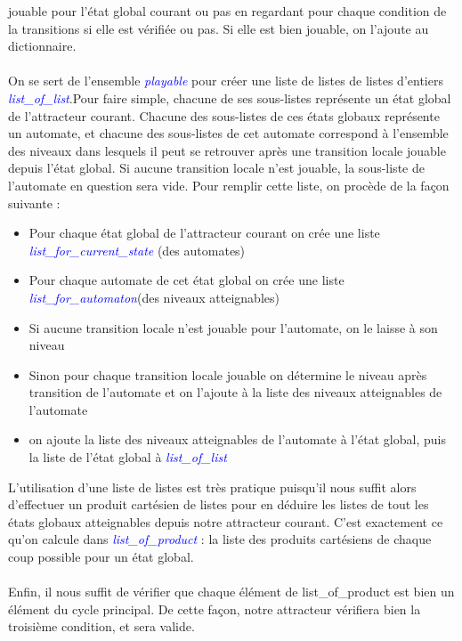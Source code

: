 \documentclass[10pt,a4paper]{article}
\begin{document}
jouable pour l'état global courant ou pas en regardant pour chaque condition de la transitions si elle est vérifiée ou pas. Si elle est bien jouable, on l'ajoute au dictionnaire.\\ \\
On se sert de l'ensemble \emph{\textcolor{blue}{playable}} pour créer une liste de listes de listes d'entiers \emph{\textcolor{blue}{list\_of\_list}}.Pour faire simple, chacune de ses sous-listes représente un état global de 
l'attracteur courant. Chacune des sous-listes de ces états globaux représente un automate, et chacune des sous-listes de cet automate correspond à l'ensemble des niveaux dans lesquels il peut se retrouver après une transition locale 
jouable depuis l'état global. Si aucune transition locale n'est jouable, la sous-liste de l'automate en question sera vide. Pour remplir cette liste, on procède de la façon suivante :\\
\begin{itemize}
	\item Pour chaque état global de l'attracteur courant on crée une liste \emph{\textcolor{blue}{list\_for\_current\_state}} (des automates)
	\item Pour chaque automate de cet état global on crée une liste \emph{\textcolor{blue}{list\_for\_automaton}}(des niveaux atteignables)
	\item Si aucune transition locale n'est jouable pour l'automate, on le laisse à son niveau
	\item Sinon pour chaque transition locale jouable on détermine le niveau après transition de l'automate et on l'ajoute à la liste des niveaux atteignables de l'automate
	\item on ajoute la liste des niveaux atteignables de l'automate à l'état global, puis la liste de l'état global à \emph{\textcolor{blue}{list\_of\_list}}\\
\end{itemize}
L'utilisation d'une liste de listes est très pratique puisqu'il nous suffit alors d'effectuer un produit cartésien de listes pour en déduire les listes de tout les états globaux atteignables depuis notre attracteur courant. C'est 
exactement ce qu'on calcule dans \emph{\textcolor{blue}{list\_of\_product}} : la liste des produits cartésiens de chaque coup possible pour un état global.\\ \\
Enfin, il nous suffit de vérifier que chaque élément de list\_of\_product est bien un élément du cycle principal. De cette façon, notre attracteur vérifiera bien la troisième condition, et sera valide.
\end{document}
